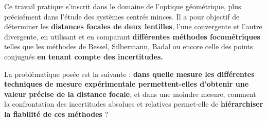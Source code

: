 Ce travail pratique s'inscrit dans le domaine de l'optique géométrique,
plus précisément dans l'étude des systèmes centrés minces.
Il a pour objectif de déterminer les \textbf{distances focales
de deux lentilles}, l'une convergente et l'autre divergente,
en utilisant et en comparant \textbf{différentes méthodes focométriques}
telles que les méthodes de Bessel, Silbermann, Badal
ou encore celle des points conjugués \textbf{en tenant compte des incertitudes.}

La problématique posée est la suivante :
\textbf{dans quelle mesure les différentes techniques de mesure expérimentale
permettent-elles d'obtenir une valeur précise de la distance focale},
et dans une moindre mesure, comment la confrontation des incertitudes absolues et relatives 
permet-elle de \textbf{hiérarchiser la fiabilité de ces méthodes} ?